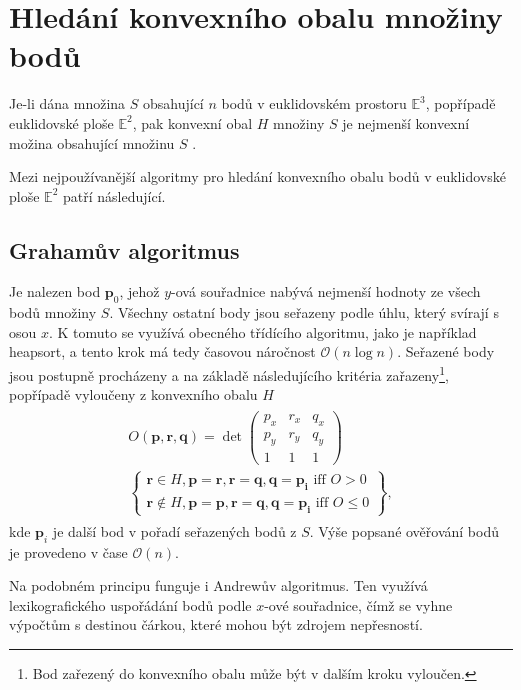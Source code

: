 \documentclass[twoside]{ctuthesis}
\begin{document}
\section{Hledání konvexního obalu množiny bodů}
Je-li dána množina $S$ obsahující $n$ bodů v euklidovském prostoru $\mathbb{E}^3$, popřípadě euklidovské ploše $\mathbb{E}^2$, pak konvexní obal $H$ množiny $S$ je nejmenší konvexní možina obsahující množinu $S$ \cite{chan1996optimal}.

Mezi nejpoužívanější algoritmy pro hledání konvexního obalu bodů v  euklidovské ploše $\mathbb{E}^2$ patří následující.
\subsection{Grahamův algoritmus}
Je nalezen bod $\mathbf{p}_0$, jehož $y$-ová souřadnice nabývá nejmenší hodnoty ze všech bodů množiny $S$. Všechny ostatní body jsou seřazeny podle úhlu, který svírají s osou $x$. K tomuto se využívá obecného třídícího algoritmu, jako je například heapsort, a tento krok má tedy časovou náročnost $\mathcal{O}(n\log n)$. Seřazené body jsou postupně procházeny a na základě následujícího kritéria zařazeny\footnote{Bod zařezený do konvexního obalu může být v dalším kroku vyloučen.}, popřípadě vyloučeny z konvexního obalu $H$ \cite{convex_hull_formalizing}
        \begin{align}
            \begin{gathered}
            O(\mathbf{p}, \mathbf{r}, \mathbf{q}) = \det \begin{pmatrix} p_x & r_x & q_x \\ p_y & r_y & q_y \\ 1 & 1 & 1 \end{pmatrix} \\
            \left\{ \begin{gathered}
                    \mathbf{r} \in H, \mathbf{p} = \mathbf{r}, \mathbf{r} = \mathbf{q}, \mathbf{q}  = \mathbf{p_i} \text{ iff } O > 0 \\
                    \mathbf{r} \notin H, \mathbf{p} = \mathbf{p}, \mathbf{r} = \mathbf{q}, \mathbf{q}  = \mathbf{p_i} \text{ iff } O \leq 0
            \end{gathered} \right\},
        \end{gathered}
        \end{align}
kde $\mathbf{p}_i$ je další bod v pořadí seřazených bodů z $S$. Výše popsané ověřování bodů je provedeno v čase $\mathcal{O}(n)$.


Na podobném principu funguje i Andrewův algoritmus. Ten využívá lexikografického uspořádání bodů podle $x$-ové souřadnice, čímž se vyhne výpočtům s destinou čárkou, které mohou být zdrojem nepřesností.\cite{convex_hull_review}
\end{document}
